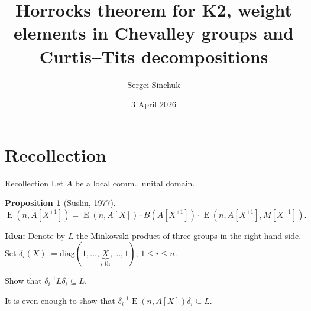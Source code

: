 \documentclass{beamer} %
\title{Horrocks theorem for \texorpdfstring{K2}{$К_2$}, weight elements in Chevalley groups and Curtis--Tits decompositions}
\author{Sergei Sinchuk}
\date{3 April 2026}
\DeclareMathOperator{\E}{E}
\theoremstyle{definition}
\newtheorem*{prop}{Proposition}
\begin{document}
\begin{frame}
\titlepage
\end{frame}

\section{Recollection}

\begin{frame} \tableofcontents[currentsection] \end{frame}

\begin{frame}{Recollection}
Let $A$ be a local comm., unital domain.
\begin{prop}[Suslin, 1977]
 \( \E(n, A[X^{\pm 1}]) = \E(n, A[X]) \cdot B(A[X^{\pm 1}]) \cdot \E(n, A[X^{\pm 1}], M[X^{\pm 1}]). \)
\end{prop}
\pause
\textbf{Idea:} Denote by $L$ the Minkowski-product of three groups in the right-hand side.
Set $\delta_i(X) := \mathrm{diag}(1, \ldots, \underbrace{X}_{i\text{-th}}, \ldots, 1)$, $1 \leq i \leq n$.

\pause Show that $\delta_i^{-1} L \delta_i \subseteq L$.

\pause It is even enough to show that $\delta_i^{-1} \E(n, A[X]) \delta_i \subseteq L$.
\end{frame}
\end{document}
